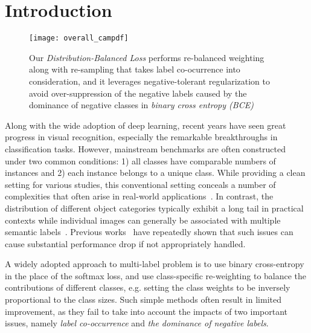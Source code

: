 \documentclass[runningheads]{llncs}
\begin{document}
\section{Introduction}
\label{sec:introduction}

\begin{figure}[t]
	\centering
	\texttt{[image: overall\_campdf]}
	\caption{ 
		Our \emph{Distribution-Balanced Loss} performs re-balanced weighting along with re-sampling that takes label co-ocurrence into consideration, and it leverages negative-tolerant regularization to avoid over-suppression of the negative labels caused by the dominance of negative classes in \emph{binary cross entropy (BCE)} 
	}
	\label{fig:overall} 
\end{figure} 

Along with the wide adoption of deep learning, recent years have seen great progress in visual recognition, especially the remarkable breakthroughs in classification tasks. However, mainstream benchmarks are often constructed under two common conditions: 1) all classes have comparable numbers of instances and 2) each instance belongs to a unique class. While providing a clean setting for various studies, this conventional setting conceals a number of complexities that often arise in real-world applications~\cite{liu2019largescale,liu2020open,huang2020caption,huang2018person}. In contrast, the distribution of different object categories typically exhibit a long tail in practical contexts while individual images can generally be associated with multiple semantic labels~\cite{liu2015deep,liu2016deepfashion,huang2020movie,Xiong_2019_ICCV}. Previous works~\cite{japkowicz2002class,horn2017devil,buda2018systematic} have repeatedly shown that such issues can cause substantial performance drop if not appropriately handled.  

A widely adopted approach to multi-label problem is to use binary cross-entropy~\cite{dur2019partial} in the place of the softmax loss, and use class-specific re-weighting to balance the contributions of different classes, e.g. setting the class weights to be inversely proportional to the class sizes. Such simple methods often result in limited improvement, as they fail to take into account the impacts of two important issues, namely \emph{label co-occurrence} and \emph{the dominance of negative labels}.
\end{document}
